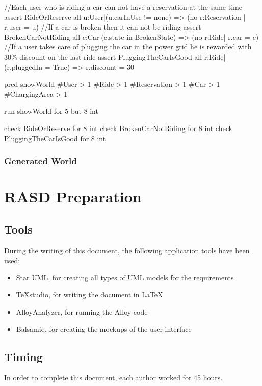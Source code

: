 \documentclass[11pt,a4paper]{report}
\begin{document}
\begin{alloyCode}
//Each user who is riding a car can not have a reservation at the same time
assert RideOrReserve{
	all u:User|(u.carInUse != none) => (no r:Reservation | r.user = u)
}
//If a car is broken then it can not be riding
assert BrokenCarNotRiding{
	all c:Car|(c.state in BrokenState) => (no r:Ride| r.car = c)
}
//If a user takes care of plugging the car in the power grid he is rewarded with 30\% discount on the last ride
assert PluggingTheCarIsGood{
	all r:Ride|(r.pluggedIn = True) => r.discount = 30
}

pred showWorld{
	#User > 1
	#Ride > 1 
	#Reservation > 1
	#Car > 1 
	#ChargingArea > 1
}

run showWorld for 5 but 8 int

check RideOrReserve for 8 int
check BrokenCarNotRiding for 8 int
check PluggingTheCarIsGood for 8 int
\end{alloyCode}
\vspace*{0.3cm} %
\subsection{Generated World}

\chapter{RASD Preparation}
\section{Tools}
During the writing of this document, the following application tools have been used:
\begin{itemize}
	\item Star UML, for creating all types of UML models for the requirements
	\item TeXstudio, for writing the document in \LaTeX
	\item AlloyAnalyzer, for running the Alloy code
	\item Balsamiq, for creating the mockups of the user interface
\end{itemize}
\section{Timing}
In order to complete this document, each author worked for 45 hours.
\end{document}
